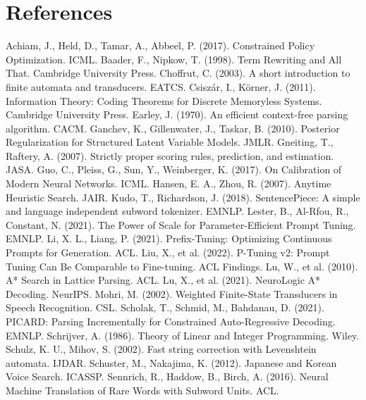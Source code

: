 \documentclass{article}
\begin{document}
\section*{References}
\begin{thebibliography}{99}
 Achiam, J., Held, D., Tamar, A., Abbeel, P. (2017). Constrained Policy Optimization. ICML.
 Baader, F., Nipkow, T. (1998). Term Rewriting and All That. Cambridge University Press.
 Choffrut, C. (2003). A short introduction to finite automata and transducers. EATCS.
 Csiszár, I., Körner, J. (2011). Information Theory: Coding Theorems for Discrete Memoryless Systems. Cambridge University Press.
 Earley, J. (1970). An efficient context-free parsing algorithm. CACM.
 Ganchev, K., Gillenwater, J., Taskar, B. (2010). Posterior Regularization for Structured Latent Variable Models. JMLR.
 Gneiting, T., Raftery, A. (2007). Strictly proper scoring rules, prediction, and estimation. JASA.
 Guo, C., Pleiss, G., Sun, Y., Weinberger, K. (2017). On Calibration of Modern Neural Networks. ICML.
 Hansen, E. A., Zhou, R. (2007). Anytime Heuristic Search. JAIR.
 Kudo, T., Richardson, J. (2018). SentencePiece: A simple and language independent subword tokenizer. EMNLP.
 Lester, B., Al-Rfou, R., Constant, N. (2021). The Power of Scale for Parameter-Efficient Prompt Tuning. EMNLP.
 Li, X. L., Liang, P. (2021). Prefix-Tuning: Optimizing Continuous Prompts for Generation. ACL.
 Liu, X., et al. (2022). P-Tuning v2: Prompt Tuning Can Be Comparable to Fine-tuning. ACL Findings.
 Lu, W., et al. (2010). A* Search in Lattice Parsing. ACL.
 Lu, X., et al. (2021). NeuroLogic A* Decoding. NeurIPS.
 Mohri, M. (2002). Weighted Finite-State Transducers in Speech Recognition. CSL.
 Scholak, T., Schmid, M., Bahdanau, D. (2021). PICARD: Parsing Incrementally for Constrained Auto-Regressive Decoding. EMNLP.
 Schrijver, A. (1986). Theory of Linear and Integer Programming. Wiley.
 Schulz, K. U., Mihov, S. (2002). Fast string correction with Levenshtein automata. IJDAR.
 Schuster, M., Nakajima, K. (2012). Japanese and Korean Voice Search. ICASSP.
 Sennrich, R., Haddow, B., Birch, A. (2016). Neural Machine Translation of Rare Words with Subword Units. ACL.

\end{thebibliography}
\end{document}
